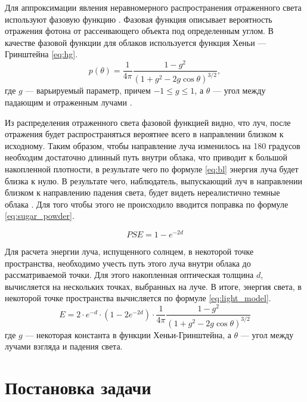 Для аппроксимации явления неравномерного распространения отраженного света используют фазовую функцию \cite{partmedia, hzd, frostbite, clouds}.
Фазовая функция описывает вероятность отражения фотона от рассеивающего объекта под определенным углом. 
В качестве фазовой функции для облаков используется функция Хеньи --- Гринштейна \eqref{eq:hg}.  
\begin{equation}
	\label{eq:hg}
	p(\theta) = \frac{1}{4\pi} \frac{1 - g^2}{(1 + g^2 - 2g\cos \theta)^{3/2}},
\end{equation}
где $ g $ --- варьируемый параметр, причем $ -1 \leq g \leq 1 $, а $\theta$ --- угол между падающим и отраженным лучами \cite{clouds}.


Из распределения отраженного света фазовой функцией видно, что луч, после отражения будет распространяться вероятнее всего в направлении близком к исходному. 
Таким образом, чтобы направление луча изменилось на 180 градусов необходим достаточно длинный путь внутри облака, что приводит к большой накопленной плотности, в результате чего по формуле \ref{eq:bl} энергия луча будет близка к нулю. 
В результате чего, наблюдатель, выпускающий луч в направлении близком к направлению падения света, будет видеть нереалистично темные облака \cite{hzd}. Для того чтобы этого не происходило вводится поправка по формуле \eqref{eq:sugar_powder}.

\begin{equation}
	\label{eq:sugar_powder}
	PSE = 1 - e ^ {-2 d}
\end{equation}

Для расчета энергии луча, испущенного солнцем, в некоторой точке пространства, необходимо учесть путь этого луча внутри облака до рассматриваемой точки.
Для этого накопленная оптическая толщина $d$, вычисляется на нескольких точках, выбранных на луче.
В итоге, энергия света, в некоторой точке пространства вычисляется по формуле \eqref{eq:light_model}.
\begin{equation}
	\label{eq:light_model}
	E = 2 \cdot e ^ {-d} \cdot (1 - 2 e ^ {-2d}) \cdot \frac{1}{4\pi} \frac{1 - g^2}{(1 + g^2 - 2g\cos \theta)^{3/2}}
\end{equation}
где $ g $ --- некоторая константа в функции Хеньи-Гринштейна, а $ \theta $ --- угол между лучами взгляда и падения света.

\section{Постановка задачи}

